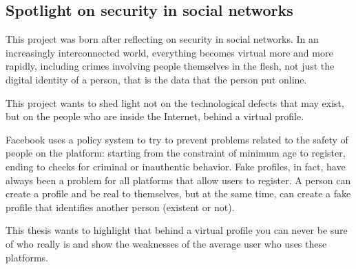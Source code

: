 \subsection{Spotlight on security in social networks}
This project was born after reflecting on security in social networks. In an increasingly interconnected world, everything becomes virtual more and more rapidly, including crimes involving people themselves in the flesh, not just the digital identity of a person, that is the data that the person put online.\par \noindent
This project wants to shed light not on the technological defects that may exist, but on the people who are inside the Internet, behind a virtual profile.\par 	\noindent
Facebook uses a policy system to try to prevent problems related to the safety of people on the platform: starting from the constraint of minimum age to register, ending to checks for criminal or inauthentic behavior. Fake profiles, in fact, have always been a problem for all platforms that allow users to register. A person can create a profile and be real to themselves, but at the same time, can create a fake profile that identifies another person (existent or not). \par 	\noindent
This thesis wants to highlight that behind a virtual profile you can never be sure of who really is and show the weaknesses of the average user who uses these platforms.